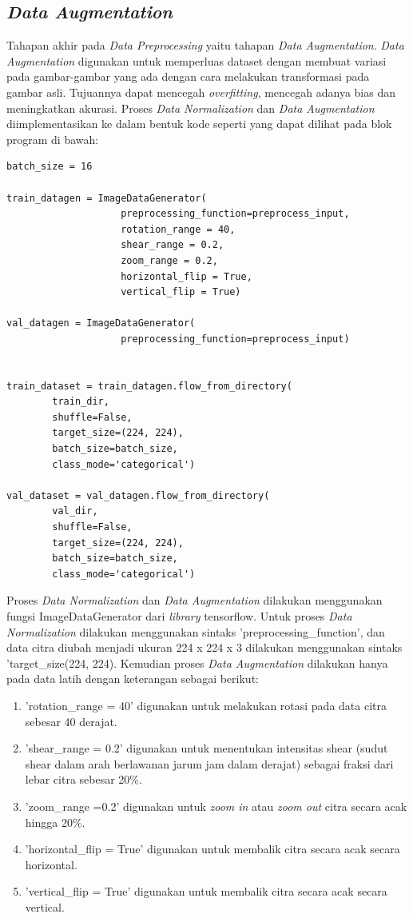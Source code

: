 \subsection{\textit{Data Augmentation}}
Tahapan akhir pada \textit{Data Preprocessing} yaitu tahapan \textit{Data Augmentation}. \textit{Data Augmentation} digunakan untuk memperluas dataset dengan membuat variasi pada gambar-gambar yang ada dengan cara melakukan transformasi pada gambar asli. Tujuannya dapat mencegah \textit{overfitting}, mencegah adanya bias dan meningkatkan akurasi. Proses \textit{Data Normalization} dan \textit{Data Augmentation} diimplementasikan ke dalam bentuk kode seperti yang dapat dilihat pada blok program di bawah:

\begin{lstlisting}[style=customc]
batch_size = 16

train_datagen = ImageDataGenerator(
                    preprocessing_function=preprocess_input,
                    rotation_range = 40,
                    shear_range = 0.2,
                    zoom_range = 0.2,
                    horizontal_flip = True,
                    vertical_flip = True)

val_datagen = ImageDataGenerator(
                    preprocessing_function=preprocess_input)


train_dataset = train_datagen.flow_from_directory(
        train_dir,
        shuffle=False,
        target_size=(224, 224),
        batch_size=batch_size,
        class_mode='categorical')

val_dataset = val_datagen.flow_from_directory(
        val_dir,
        shuffle=False,
        target_size=(224, 224),
        batch_size=batch_size,
        class_mode='categorical')
\end{lstlisting}

Proses \textit{Data Normalization} dan \textit{Data Augmentation} dilakukan menggunakan fungsi ImageDataGenerator dari \textit{library} tensorflow. Untuk proses \textit{Data Normalization} dilakukan menggunakan sintaks 'preprocessing\_function', dan data citra diubah menjadi ukuran 224 x 224 x 3 dilakukan menggunakan sintaks 'target\_size(224, 224). Kemudian proses \textit{Data Augmentation} dilakukan hanya pada data latih dengan keterangan sebagai berikut:
\begin{enumerate}
    \item 'rotation\_range = 40' digunakan untuk melakukan rotasi pada data citra sebesar 40 derajat.
    \item 'shear\_range = 0.2' digunakan untuk menentukan intensitas shear (sudut shear dalam arah berlawanan jarum jam dalam derajat) sebagai fraksi dari lebar citra sebesar 20\%.
    \item 'zoom\_range =0.2' digunakan untuk \textit{zoom in} atau \textit{zoom out} citra secara acak hingga 20\%.
    \item 'horizontal\_flip = True' digunakan untuk membalik citra secara acak secara horizontal.
    \item 'vertical\_flip = True' digunakan untuk membalik citra secara acak secara vertical.
\end{enumerate}

